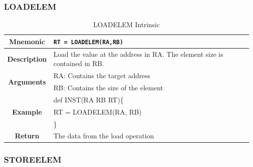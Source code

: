 \documentclass{article}
\begin{document}
\clearpage
\subsubsection{LOADELEM}
\label{sec:LOADELEM}

\begin{table}[h]
\begin{center}
\caption{LOADELEM Intrinsic}
\vspace{0.125in}
\label{tab:LOADELEMIntrinsic}
\begin{tabular}{|c|l|}
\hline
\textbf{Mnemonic} & \texttt{RT = LOADELEM(RA,RB)}\\
\hline
\textbf{Description} & Load the value at the address in RA.  The element size is contained in RB. \\
\hline
\multirow{2}{*}{\textbf{Arguments}} & RA: Contains the target address\\
                          			     & RB: Contains the size of the element \\
\hline
\multirow{3}{*}{\textbf{Example}} & def INST(RA RB RT)\{\\
                          			  &   RT = LOADELEM(RA, RB)\\
                                                    & \}\\
\hline
\textbf{Return} & The data from the load operation\\                                                    
\hline
\end{tabular}
\end{center}
\end{table}

\clearpage
\subsubsection{STOREELEM}
\label{sec:STOREELEM}
\end{document}
